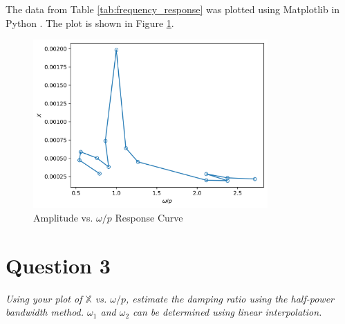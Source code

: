The data from Table \ref{tab:frequency_response} was plotted using Matplotlib in Python \cite{matplotlib}. The plot is shown in Figure \ref{fig:frequency_response_curve}. 
\begin{figure}[H]
    \centering
    \includegraphics[width=0.8\textwidth]{Questions/Plots/X_vs_omega_p.png}
    \caption{Amplitude vs. $\omega/p$ Response Curve}
    \label{fig:frequency_response_curve}
\end{figure}

\section{Question 3}
\textit{Using your plot of $\mathbb{X}$ vs. $\omega/p$, estimate the damping ratio using the half-power bandwidth method. $\omega_1$ and $\omega_2$ can be determined using linear interpolation.}

